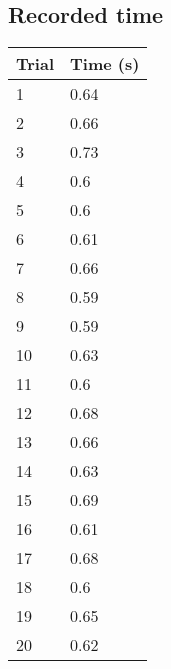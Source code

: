\documentclass[11pt, letterpaper, includehead]{article}
\begin{document}
\subsection{Recorded time} %
\begin{center}
  \begin{tabular}{|  m{2cm} | m{2cm} | }
    \hline

    \textbf{Trial} & \textbf{Time (s)} \\
    \hline
    1              & 0.64              \\
    \hline
    2              & 0.66              \\
    \hline
    3              & 0.73              \\
    \hline
    4              & 0.6               \\
    \hline
    5              & 0.6               \\
    \hline
    6              & 0.61              \\
    \hline
    7              & 0.66              \\
    \hline
    8              & 0.59              \\
    \hline
    9              & 0.59              \\
    \hline
    10             & 0.63              \\
    \hline
    11             & 0.6               \\
    \hline
    12             & 0.68              \\
    \hline
    13             & 0.66              \\
    \hline
    14             & 0.63              \\
    \hline
    15             & 0.69              \\
    \hline
    16             & 0.61              \\
    \hline
    17             & 0.68              \\
    \hline
    18             & 0.6               \\
    \hline
    19             & 0.65              \\
    \hline
    20             & 0.62              \\
    \hline
  \end{tabular}
\end{center}

\setcounter{subsection}{3} %
\end{document}

